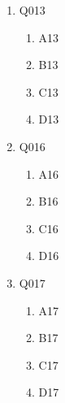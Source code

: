 \documentclass[12pt]{article}
\begin{document}
\begin{enumerate}
    \item Q013
    \begin{enumerate}[label=(\Alph*)]
        
        \item A13
        
        \item B13
        
        \item C13
        
        \item D13
        
    \end{enumerate}

    \item Q016
    \begin{enumerate}[label=(\Alph*)]
        
        \item A16
        
        \item B16
        
        \item C16
        
        \item D16
        
    \end{enumerate}

    \item Q017
    \begin{enumerate}[label=(\Alph*)]
        
        \item A17
        
        \item B17
        
        \item C17
        
        \item D17
        
    \end{enumerate}

\end{enumerate}
\end{document}
